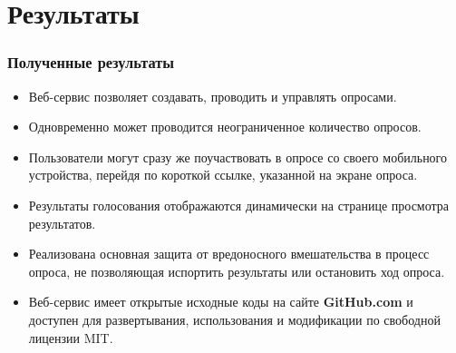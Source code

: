 \documentclass{beamer}
\begin{document}
\begin{frame}
\begin{columns}[c]
\end{columns}
\end{frame}


\section{Результаты}
\begin{frame}
\frametitle{Полученные результаты}
	\begin{itemize}
		\item Веб-сервис позволяет создавать, проводить и управлять опросами.
		\item Одновременно может проводится неограниченное количество опросов.
		\item Пользователи могут сразу же поучаствовать в опросе со своего мобильного устройства, перейдя по короткой ссылке, указанной на экране опроса.
		\item Результаты голосования отображаются динамически на странице просмотра результатов.
		\item Реализована основная защита от вредоносного вмешательства в процесс опроса, не позволяющая испортить результаты или остановить ход опроса.
		\item Веб-сервис имеет открытые исходные коды на сайте \textbf{GitHub.com} и доступен для развертывания, использования и модификации по свободной лицензии MIT. 
	\end{itemize}   
\end{frame}
\end{document}
